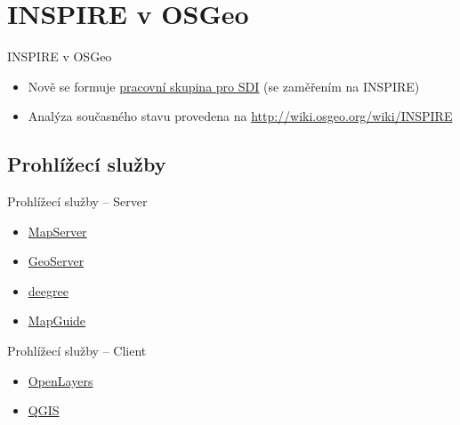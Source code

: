 \documentclass{beamer}
\begin{document}
\section{INSPIRE v OSGeo}

\begin{frame}{INSPIRE v OSGeo}
    \begin{itemize}
        \item Nově se formuje
            \href{http://wiki.osgeo.org/wiki/SDI_committee}{pracovní skupina pro
            SDI} (se zaměřením na INSPIRE)
        \item Analýza současného stavu provedena na
            \url{http://wiki.osgeo.org/wiki/INSPIRE} {\em } 
    \end{itemize}
\end{frame}

\subsection{Prohlížecí služby}
\begin{frame}{Prohlížecí služby -- Server}
    \begin{itemize}
        \item \href{http://mapserver.org}{MapServer}
        \item \href{http://geoserver.org}{GeoServer}
        \item \href{http://deegree.org}{deegree}
        \item \href{http://mapguide.osgeo.org}{MapGuide}
    \end{itemize}
\end{frame}

\begin{frame}{Prohlížecí služby -- Client}
    \begin{itemize}
        \item \href{http://openlayers.org}{OpenLayers}
        \item \href{http://qgis.org}{QGIS}
    \end{itemize}
\end{frame}
\end{document}
